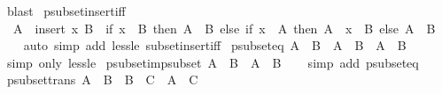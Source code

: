 \begin{isabellebody}
\ blast%
\endisatagproof
{\isafoldproof}%
%
\isadelimproof
\isanewline
%
\endisadelimproof
\isanewline
{}\isamarkupfalse%
\ psubset{\isacharunderscore}{\kern0pt}insert{\isacharunderscore}{\kern0pt}iff{\isacharcolon}{\kern0pt}\isanewline
\ \ {\isachardoublequoteopen}A\ {\isasymsubset}\ insert\ x\ B\ {\isasymlongleftrightarrow}\ {\isacharparenleft}{\kern0pt}if\ x\ {\isasymin}\ B\ then\ A\ {\isasymsubset}\ B\ else\ if\ x\ {\isasymin}\ A\ then\ A\ {\isacharminus}{\kern0pt}\ {\isacharbraceleft}{\kern0pt}x{\isacharbraceright}{\kern0pt}\ {\isasymsubset}\ B\ else\ A\ {\isasymsubseteq}\ B{\isacharparenright}{\kern0pt}{\isachardoublequoteclose}\isanewline
%
\isadelimproof
\ \ %
\endisadelimproof
%
\isatagproof
{}\isamarkupfalse%
\ {\isacharparenleft}{\kern0pt}auto\ simp\ add{\isacharcolon}{\kern0pt}\ less{\isacharunderscore}{\kern0pt}le\ subset{\isacharunderscore}{\kern0pt}insert{\isacharunderscore}{\kern0pt}iff{\isacharparenright}{\kern0pt}%
\endisatagproof
{\isafoldproof}%
%
\isadelimproof
\isanewline
%
\endisadelimproof
\isanewline
{}\isamarkupfalse%
\ psubset{\isacharunderscore}{\kern0pt}eq{\isacharcolon}{\kern0pt}\ {\isachardoublequoteopen}A\ {\isasymsubset}\ B\ {\isasymlongleftrightarrow}\ A\ {\isasymsubseteq}\ B\ {\isasymand}\ A\ {\isasymnoteq}\ B{\isachardoublequoteclose}\isanewline
%
\isadelimproof
\ \ %
\endisadelimproof
%
\isatagproof
{}\isamarkupfalse%
\ {\isacharparenleft}{\kern0pt}simp\ only{\isacharcolon}{\kern0pt}\ less{\isacharunderscore}{\kern0pt}le{\isacharparenright}{\kern0pt}%
\endisatagproof
{\isafoldproof}%
%
\isadelimproof
\isanewline
%
\endisadelimproof
\isanewline
{}\isamarkupfalse%
\ psubset{\isacharunderscore}{\kern0pt}imp{\isacharunderscore}{\kern0pt}subset{\isacharcolon}{\kern0pt}\ {\isachardoublequoteopen}A\ {\isasymsubset}\ B\ {\isasymLongrightarrow}\ A\ {\isasymsubseteq}\ B{\isachardoublequoteclose}\isanewline
%
\isadelimproof
\ \ %
\endisadelimproof
%
\isatagproof
{}\isamarkupfalse%
\ {\isacharparenleft}{\kern0pt}simp\ add{\isacharcolon}{\kern0pt}\ psubset{\isacharunderscore}{\kern0pt}eq{\isacharparenright}{\kern0pt}%
\endisatagproof
{\isafoldproof}%
%
\isadelimproof
\isanewline
%
\endisadelimproof
\isanewline
{}\isamarkupfalse%
\ psubset{\isacharunderscore}{\kern0pt}trans{\isacharcolon}{\kern0pt}\ {\isachardoublequoteopen}A\ {\isasymsubset}\ B\ {\isasymLongrightarrow}\ B\ {\isasymsubset}\ C\ {\isasymLongrightarrow}\ A\ {\isasymsubset}\ C{\isachardoublequoteclose}\isanewline
%
\isadelimproof
\ \ %
\endisadelimproof
%
\isatagproof

\end{isabellebody}
